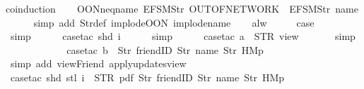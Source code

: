 \begin{isabellebody}
%
\isadelimproof
%
\endisadelimproof
%
\isatagproof
{}\isamarkupfalse%
{\isacharparenleft}coinduction{\isacharparenright}\isanewline
\ \ \isamarkupfalse%
\ OON{\isacharunderscore}neq{\isacharunderscore}name{\isacharcolon}\ {\isachardoublequoteopen}EFSM{\isachardot}Str\ {\isacharprime}{\isacharprime}OUT{\isacharunderscore}OF{\isacharunderscore}NETWORK{\isacharprime}{\isacharprime}\ {\isasymnoteq}\ EFSM{\isachardot}Str\ {\isacharprime}{\isacharprime}name{\isacharprime}{\isacharprime}{\isachardoublequoteclose}\isanewline
\ \ \ \ \isamarkupfalse%
\ {\isacharparenleft}simp\ add{\isacharcolon}\ Str{\isacharunderscore}def\ implode{\isacharunderscore}OON\ implode{\isacharunderscore}name{\isacharparenright}\isanewline
\ \ \isamarkupfalse%
\ alw\isanewline
\ \ \isamarkupfalse%
\ \isamarkupfalse%
\ {\isacharquery}case\isanewline
\ \ \ \ \isamarkupfalse%
\ simp\isanewline
\ \ \ \ \isamarkupfalse%
\ {\isacharparenleft}case{\isacharunderscore}tac\ {\isachardoublequoteopen}shd\ i{\isachardoublequoteclose}{\isacharparenright}\isanewline
\ \ \ \ \isamarkupfalse%
\ simp\isanewline
\ \ \ \ \isamarkupfalse%
\ {\isacharparenleft}case{\isacharunderscore}tac\ {\isachardoublequoteopen}a\ {\isacharequal}\ STR\ {\isacharprime}{\isacharprime}view{\isacharprime}{\isacharprime}{\isachardoublequoteclose}{\isacharparenright}\isanewline
\ \ \ \ \ \isamarkupfalse%
\ simp\isanewline
\ \ \ \ \ \isanewline
\ \ \ \ \ \isamarkupfalse%
\ {\isacharparenleft}case{\isacharunderscore}tac\ {\isachardoublequoteopen}b\ {\isacharequal}\ {\isacharbrackleft}Str\ {\isacharprime}{\isacharprime}friendID{\isacharprime}{\isacharprime}{\isacharcomma}\ Str\ {\isacharprime}{\isacharprime}name{\isacharprime}{\isacharprime}{\isacharcomma}\ Str\ {\isacharprime}{\isacharprime}HM{}p{\isacharprime}{\isacharprime}{\isacharbrackright}{\isachardoublequoteclose}{\isacharparenright}\isanewline
\ \ \ \ \ \ \isamarkupfalse%
\ {\isacharparenleft}simp\ add{\isacharcolon}\ viewFriend\ apply{\isacharunderscore}updates{\isacharunderscore}view{\isacharparenright}\isanewline
\ \ \ \ \ \ \isamarkupfalse%
\ {\isacharparenleft}case{\isacharunderscore}tac\ {\isachardoublequoteopen}shd\ {\isacharparenleft}stl\ i{\isacharparenright}\ {\isacharequal}\ {\isacharparenleft}STR\ {\isacharprime}{\isacharprime}pdf{\isacharprime}{\isacharprime}{\isacharcomma}\ {\isacharbrackleft}Str\ {\isacharprime}{\isacharprime}friendID{\isacharprime}{\isacharprime}{\isacharcomma}\ Str\ {\isacharprime}{\isacharprime}name{\isacharprime}{\isacharprime}{\isacharcomma}\ Str\ {\isacharprime}{\isacharprime}HM{}p{\isacharprime}{\isacharprime}{\isacharbrackright}{\isacharparenright}{\isachardoublequoteclose}{\isacharparenright}\isanewline

\end{isabellebody}
